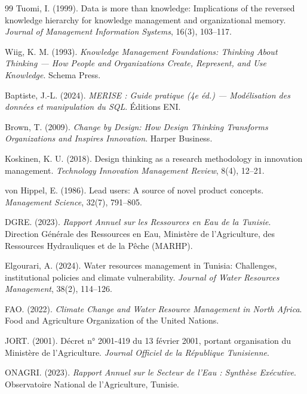 \documentclass[12pt,a4paper]{report}
\begin{document}
\begin{thebibliography}{99}
 Tuomi, I. (1999). Data is more than knowledge: Implications of the reversed knowledge hierarchy for knowledge management and organizational memory. \textit{Journal of Management Information Systems}, 16(3), 103--117.

 Wiig, K. M. (1993). \textit{Knowledge Management Foundations: Thinking About Thinking --- How People and Organizations Create, Represent, and Use Knowledge}. Schema Press.


 Baptiste, J.-L. (2024). \textit{MERISE : Guide pratique (4e éd.) --- Modélisation des données et manipulation du SQL}. Éditions ENI.

 Brown, T. (2009). \textit{Change by Design: How Design Thinking Transforms Organizations and Inspires Innovation}. Harper Business.

 Koskinen, K. U. (2018). Design thinking as a research methodology in innovation management. \textit{Technology Innovation Management Review}, 8(4), 12--21.

 von Hippel, E. (1986). Lead users: A source of novel product concepts. \textit{Management Science}, 32(7), 791--805.


 DGRE. (2023). \textit{Rapport Annuel sur les Ressources en Eau de la Tunisie}. Direction Générale des Ressources en Eau, Ministère de l'Agriculture, des Ressources Hydrauliques et de la Pêche (MARHP).

 Elgourari, A. (2024). Water resources management in Tunisia: Challenges, institutional policies and climate vulnerability. \textit{Journal of Water Resources Management}, 38(2), 114--126.

 FAO. (2022). \textit{Climate Change and Water Resource Management in North Africa}. Food and Agriculture Organization of the United Nations.

 JORT. (2001). Décret n° 2001-419 du 13 février 2001, portant organisation du Ministère de l'Agriculture. \textit{Journal Officiel de la République Tunisienne}.

 ONAGRI. (2023). \textit{Rapport Annuel sur le Secteur de l'Eau : Synthèse Exécutive}. Observatoire National de l'Agriculture, Tunisie.


\end{thebibliography}
\end{document}
